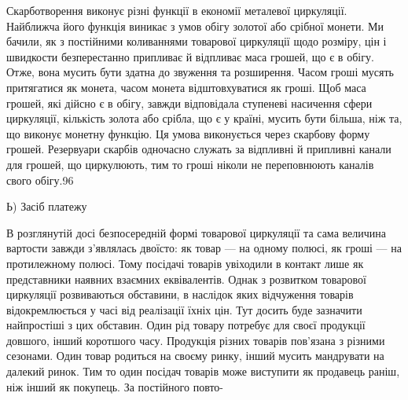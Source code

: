 Скарботворення виконує різні функції в економії металевої
циркуляції. Найближча його функція виникає з умов обігу золотої
або срібної монети. Ми бачили, як з постійними коливаннями
товарової циркуляції щодо розміру, цін і швидкости безперестанно
припливає й відпливає маса грошей, що є в обігу. Отже, вона
мусить бути здатна до звуження та розширення. Часом гроші
мусять притягатися як монета, часом монета відштовхуватися
як гроші. Щоб маса грошей, які дійсно є в обігу, завжди відповідала
ступеневі насичення сфери циркуляції, кількість золота
або срібла, що є у країні, мусить бути більша, ніж та, що виконує
монетну функцію. Ця умова виконується через скарбову
форму грошей. Резервуари скарбів одночасно служать за відпливні
й припливні канали для грошей, що циркулюють, тим то
гроші ніколи не переповнюють каналів свого обігу.96

Ь) Засіб платежу

В розглянутій досі безпосередній формі товарової циркуляції
та сама величина вартости завжди з’являлась двоїсто: як товар —
на одному полюсі, як гроші — на протилежному полюсі. Тому
посідачі товарів увіходили в контакт лише як представники
наявних взаємних еквівалентів. Однак з розвитком товарової
циркуляції розвиваються обставини, в наслідок яких відчуження
товарів відокремлюється у часі від реалізації їхніх цін. Тут
досить буде зазначити найпростіші з цих обставин. Один рід
товару потребує для своєї продукції довшого, інший коротшого
часу. Продукція різних товарів пов’язана з різними сезонами.
Один товар родиться на своєму ринку, інший мусить мандрувати
на далекий ринок. Тим то один посідач товарів може виступити
як продавець раніш, ніж інший як покупець. За постійного повто-

